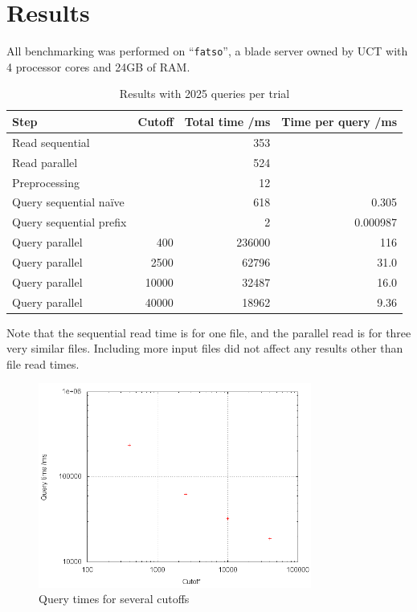 \documentclass[a4paper,12pt]{article}
\begin{document}
\section{Results}

All benchmarking was performed on ``\texttt{fatso}'', a blade server owned by UCT with 4 processor cores and 24GB of RAM.

\begin{table}[ht]
	\label{tab:results}
	\centering
	\caption{Results with 2025 queries per trial}
	\begin{tabular}{|l|r|r|r|} \hline
		Step & Cutoff & Total time /ms & Time per query /ms \\ \hline \hline
		Read sequential & & 353 & \\ \hline
		Read parallel & & 524 & \\ \hline
		Preprocessing & & 12 & \\ \hline
		Query sequential na\"ive & & 618 & 0.305 \\ \hline
		Query sequential prefix & & 2 & 0.000987 \\ \hline
		Query parallel & 400 & 236000 & 116 \\ \hline
		Query parallel & 2500 & 62796 & 31.0 \\ \hline
		Query parallel & 10000 & 32487 & 16.0 \\ \hline
		Query parallel & 40000 & 18962 & 9.36 \\ \hline
	\end{tabular}
\end{table}

Note that the sequential read time is for one file, and the parallel read is for three very similar files.  Including more input files did not affect any results other than file read times.

\begin{figure}[ht]
	\label{fig:graph}
	\centering
	\caption{Query times for several cutoffs}
	\includegraphics[width=0.80\textwidth]{graph.png}
\end{figure}
\end{document}
